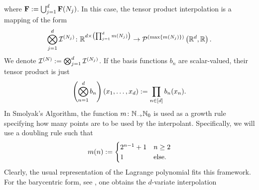 \documentclass[12pt, oneside]{amsart}
\theoremstyle{definition}
\theoremstyle{remark}
\numberwithin{equation}{section}
\begin{document}
where \(\FF \defn \bigcup_{j=1}^d \FF(N_j)\).  %
In this case, the tensor product 
interpolation is a mapping of the form
\begin{equation}\label{eq:tensorProdInterpMappingSpecification}
    \bigotimes_{j=1}^d \cI^{(N_j)}\from \R^{d \times \left(\prod_{j=1}^d 
    m(N_j) \right)} \to \pols[\left(\max \set{m(N_j)} \right)]{\R^d, \R}.
\end{equation}
We denote \(\cI^{(N)} \defn \bigotimes_{j=1}^d \cI^{(N_j)}\). If the basis functions \(b_n\) are scalar-valued, their tensor product is just
\begin{equation}\label{eq:tensorProdFunc}
    \left( \bigotimes_{n=1}^d b_n \right)(x_1, \dots, x_d) \defn \prod_{n \in [d]} b_n(x_n).
\end{equation}
In Smolyak's Algorithm, the function \(m\from \N_ \to \N_0\) is used as a 
growth 
rule specifying how many points are to be used by the interpolant. 
Specifically, we will use a doubling rule such that
\[
    m(n) \defn \begin{cases}
        2^{n-1}+1 &n \geq 2\\
        1 &\text{else}.
    \end{cases}
\]
Clearly, the usual representation of the Lagrange polynomial 
 fits this framework. For the barycentric form, 
see \cite{Berut_2004}, one obtains the \(d\)-variate interpolation
\end{document}
